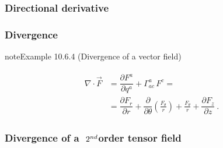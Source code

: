 \documentclass[letterpaper,10pt,english]{jupyterBook}
\begin{document}
\subsubsection{Directional derivative}
\label{\detokenize{ch/tensor-algebra-calculus/calculus-euclidean-cylindrical:directional-derivative}}\label{\detokenize{ch/tensor-algebra-calculus/calculus-euclidean-cylindrical:tensor-calculus-cylindrical-differential-operators-directional-der}}

\subsubsection{Divergence}
\label{\detokenize{ch/tensor-algebra-calculus/calculus-euclidean-cylindrical:divergence}}\label{\detokenize{ch/tensor-algebra-calculus/calculus-euclidean-cylindrical:tensor-calculus-cylindrical-differential-operators-divergence}}\label{ch/tensor-algebra-calculus/calculus-euclidean-cylindrical:example-3}
\begin{sphinxadmonition}{note}{Example 10.6.4 (Divergence of a vector field)}


\begin{equation*}
\begin{split}\begin{aligned}
  \nabla \cdot \vec{F} 
  & = \dfrac{\partial F^a}{\partial q^a} + \Gamma_{ac}^a \, F^c = \\
  & = \dfrac{\partial F_r}{\partial r} + \dfrac{\partial}{\partial \theta}\left( \frac{F_\theta}{r} \right) + \frac{F_\theta}{r} + \dfrac{\partial F_z}{\partial z} \ .
\end{aligned}\end{split}
\end{equation*}\end{sphinxadmonition}
\subsubsection*{Divergence of a \protect\(\ 2^{nd}\protect\)\sphinxhyphen{}order tensor field}
\end{document}
